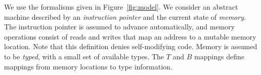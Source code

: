 We use the formalisms given in Figure~\ref{fig:model}.  We consider an
abstract machine described by an
\textit{instruction pointer} and the current state of
\textit{memory}.
The instruction pointer is assumed to advance automatically, and memory
operations consist of reads and writes that map an address to a mutable memory
location.
Note that this definition denies self-modifying code.  Memory is assumed to be
\emph{typed}, with a small set of available types.  The $T$ and $B$ mappings
define mappings from memory locations to type information.

